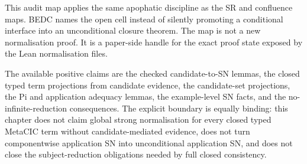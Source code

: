 This audit map applies the same apophatic discipline as the SR and confluence
maps. BEDC names the open cell instead of silently promoting a conditional
interface into an unconditional closure theorem. The map is not a new
normalisation proof. It is a paper-side handle for the exact proof state exposed
by the Lean normalisation files.

The available positive claims are the checked candidate-to-SN lemmas, the
closed typed term projections from candidate evidence, the candidate-set
projections, the Pi and application adequacy lemmas, the example-level SN facts,
and the no-infinite-reduction consequences. The explicit boundary is equally
binding: this chapter does not claim global strong normalisation for every
closed typed MetaCIC term without candidate-mediated evidence, does not turn
componentwise application SN into unconditional application SN, and does not
close the subject-reduction obligations needed by full closed consistency.

